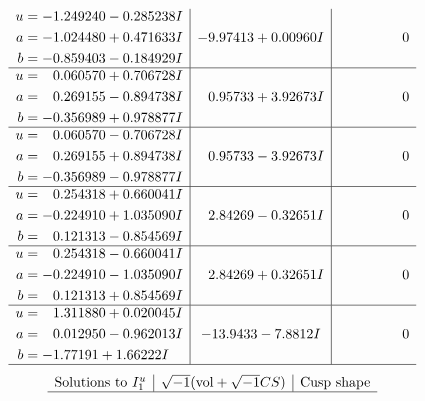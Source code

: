 \documentclass[1p]{elsarticle_modified}
\theoremstyle{definition}
\newcommand{\I}{\sqrt{-1}}
\begin{document}
$$\begin{array}{c|c|c}
\begin{aligned}
u &= -1.249240 - 0.285238 I \\
a &= -1.024480 + 0.471633 I \\
b &= -0.859403 - 0.184929 I\end{aligned}
 & -9.97413 + 0.00960 I & \phantom{-0.000000 } 0 \\ \hline\begin{aligned}
u &= \phantom{-}0.060570 + 0.706728 I \\
a &= \phantom{-}0.269155 - 0.894738 I \\
b &= -0.356989 + 0.978877 I\end{aligned}
 & \phantom{-}0.95733 + 3.92673 I & \phantom{-0.000000 } 0 \\ \hline\begin{aligned}
u &= \phantom{-}0.060570 - 0.706728 I \\
a &= \phantom{-}0.269155 + 0.894738 I \\
b &= -0.356989 - 0.978877 I\end{aligned}
 & \phantom{-}0.95733 - 3.92673 I & \phantom{-0.000000 } 0 \\ \hline\begin{aligned}
u &= \phantom{-}0.254318 + 0.660041 I \\
a &= -0.224910 + 1.035090 I \\
b &= \phantom{-}0.121313 - 0.854569 I\end{aligned}
 & \phantom{-}2.84269 - 0.32651 I & \phantom{-0.000000 } 0 \\ \hline\begin{aligned}
u &= \phantom{-}0.254318 - 0.660041 I \\
a &= -0.224910 - 1.035090 I \\
b &= \phantom{-}0.121313 + 0.854569 I\end{aligned}
 & \phantom{-}2.84269 + 0.32651 I & \phantom{-0.000000 } 0 \\ \hline\begin{aligned}
u &= \phantom{-}1.311880 + 0.020045 I \\
a &= \phantom{-}0.012950 - 0.962013 I \\
b &= -1.77191 + 1.66222 I\end{aligned}
 & -13.9433 - 7.8812 I & \phantom{-0.000000 } 0\\
 \hline 
 \end{array}$$\newpage$$\begin{array}{c|c|c}  
\text{Solutions to }I^u_{1}& \I (\text{vol} + \sqrt{-1}CS) & \text{Cusp shape}\\
 \hline 

\end{array}$$
\end{document}

